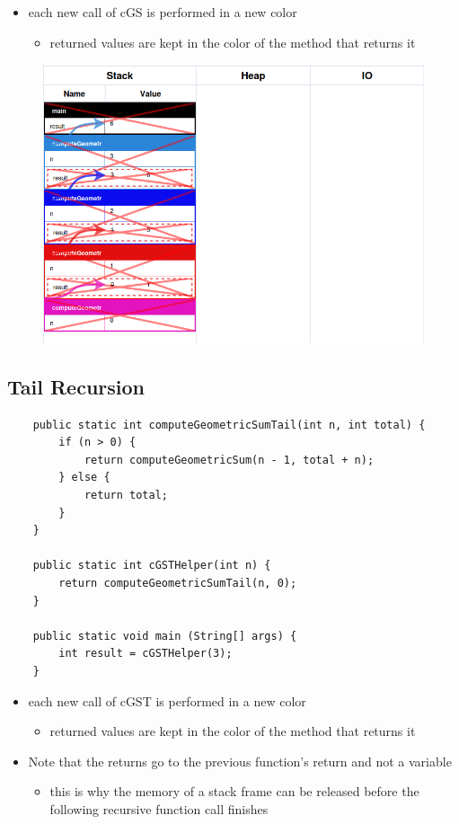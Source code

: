 \documentclass{article}
\begin{document}
\begin{itemize}
	\item each new call of cGS is performed in a new color
	\begin{itemize}
		\item returned values are kept in the color of the method that returns it
	\end{itemize}
\end{itemize}

\begin{figure}[H]
	\centering
	\includegraphics{recursionStandard.png}
\end{figure}

\pagebreak

\subsection{Tail Recursion}

\begin{verbatim}
	public static int computeGeometricSumTail(int n, int total) {
	    if (n > 0) {
	        return computeGeometricSum(n - 1, total + n);
	    } else {
	        return total;
	    }
	}

	public static int cGSTHelper(int n) {
	    return computeGeometricSumTail(n, 0);
	}

	public static void main (String[] args) {
	    int result = cGSTHelper(3);
	}
\end{verbatim}

\begin{itemize}
	\item each new call of cGST is performed in a new color
	\begin{itemize}
		\item returned values are kept in the color of the method that returns it
	\end{itemize}
	\item Note that the returns go to the previous function's return and not a variable
	\begin{itemize}
		\item this is why the memory of a stack frame can be released before
		the following recursive function call finishes
	\end{itemize}
\end{itemize}
\end{document}
